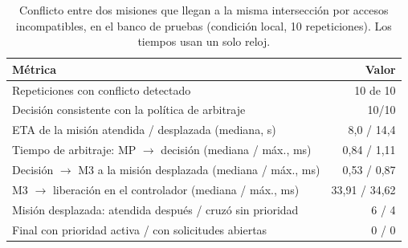 \begin{table}[H]
\centering
\caption[Conflicto entre dos misiones en el banco]{Conflicto entre dos misiones que llegan a la misma intersección por accesos incompatibles, en el banco de pruebas (condición local, 10 repeticiones). Los tiempos usan un solo reloj.}
\label{tab:conflicto}
\small
\begin{tabular}{>{\raggedright\arraybackslash}p{10.5cm}r}
\toprule
\textbf{Métrica} & \textbf{Valor} \\
\midrule
Repeticiones con conflicto detectado & 10 de 10 \\
Decisión consistente con la política de arbitraje & 10/10 \\
ETA de la misión atendida / desplazada (mediana, s) & 8,0 / 14,4 \\
Tiempo de arbitraje: MP $\to$ decisión (mediana / máx., ms) & 0,84 / 1,11 \\
Decisión $\to$ M3 a la misión desplazada (mediana / máx., ms) & 0,53 / 0,87 \\
M3 $\to$ liberación en el controlador (mediana / máx., ms) & 33,91 / 34,62 \\
Misión desplazada: atendida después / cruzó sin prioridad & 6 / 4 \\
Final con prioridad activa / con solicitudes abiertas & 0 / 0 \\
\bottomrule
\end{tabular}
\end{table}
